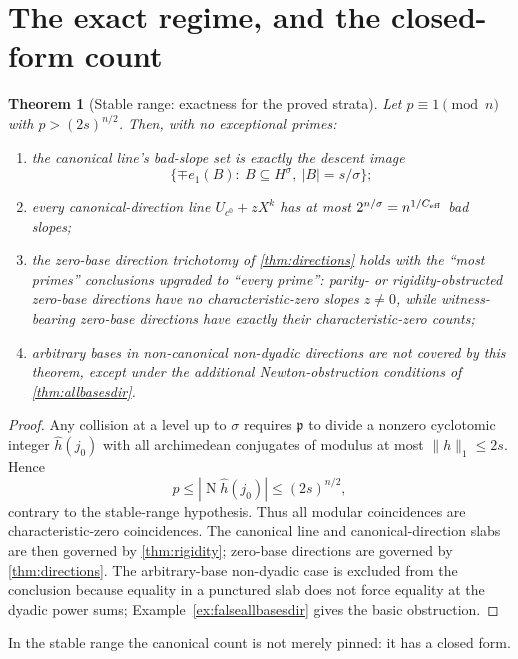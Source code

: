 \documentclass[11pt]{article}
\newtheorem{theorem}{Theorem}[section]
\theoremstyle{definition}
\newcommand{\Norm}{\operatorname{N}}
\newcommand{\ceff}{C_{\rm eff}}
\begin{document}
\section{The exact regime, and the closed-form count}\label{sec:stable}

\begin{theorem}[Stable range: exactness for the proved strata]\label{thm:stable}
Let $p\equiv1\pmod n$ with $p>(2s)^{n/2}$.  Then, with no exceptional primes:
\begin{enumerate}[label=(\roman*),leftmargin=2.2em]
\item the canonical line's bad-slope set is exactly the descent image
\[
        \{\mp e_1(B):\ B\subseteq H^\sigma,\ |B|=s/\sigma\};
\]
\item every canonical-direction line $U_{c^0}+zX^k$ has at most $2^{n/\sigma}=n^{1/\ceff}$ bad slopes;
\item the zero-base direction trichotomy of \cref{thm:directions} holds with the ``most primes'' conclusions upgraded to ``every prime'': parity- or rigidity-obstructed zero-base directions have no characteristic-zero slopes $z\ne0$, while witness-bearing zero-base directions have exactly their characteristic-zero counts;
\item arbitrary bases in non-canonical non-dyadic directions are not covered by this theorem, except under the additional Newton-obstruction conditions of \cref{thm:allbasesdir}.
\end{enumerate}
\end{theorem}

\begin{proof}
Any collision at a level up to $\sigma$ requires $\mathfrak p$ to divide a nonzero cyclotomic integer $\widehat h(j_0)$ with all archimedean conjugates of modulus at most $\|h\|_1\le2s$.  Hence
\[
        p\le |\Norm \widehat h(j_0)|\le(2s)^{n/2},
\]
contrary to the stable-range hypothesis.  Thus all modular coincidences are characteristic-zero coincidences.  The canonical line and canonical-direction slabs are then governed by \cref{thm:rigidity}; zero-base directions are governed by \cref{thm:directions}.  The arbitrary-base non-dyadic case is excluded from the conclusion because equality in a punctured slab does not force equality at the dyadic power sums; Example~\ref{ex:falseallbasesdir} gives the basic obstruction.
\end{proof}

In the stable range the canonical count is not merely pinned: it has a closed form.
\end{document}
